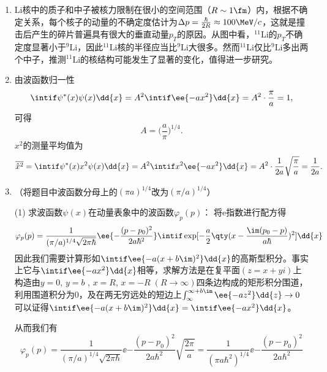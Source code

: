 \begin{enumerate}[label=2.\arabic*]
\item
Li核中的质子和中子被核力限制在很小的空间范围（$R\sim 1\fm$）内，根据不确定关系，每个核子的动量的不确定度估计为$\Delta p = \frac{\hbar}{2R} \approx 100\MeV/c$，这就是撞击后产生的碎片普遍具有很大的垂直动量$p_T$的原因。从图中看，$^{11}\mathrm{Li}$的$p_T$不确定度显著小于$^9\mathrm{Li}$，因此$^{11}\mathrm{Li}$核的半径应当比$^9\mathrm{Li}$大很多。然而$^{11}\mathrm{Li}$仅比$^9\mathrm{Li}$多出两个中子，推测$^{11}\mathrm{Li}$的核结构可能发生了显著的变化，值得进一步研究。

\item
由波函数归一性
\[\intif \psi^*(x)\psi(x)\dd{x} = A^2 \intif \ee{-ax^2}\dd{x} = A^2\cdot \frac{\pi}{a} = 1,\]
可得
\[A=\Big(\frac{a}{\pi}\Big)^{1/4}.\]
$x^2$的测量平均值为
\[\overline{\hat{x}^2} = \intif \psi^*(x)x^2\psi(x)\dd{x} = A^2\intif x^2 \ee{-ax^2}\dd{x}= A^2\cdot\frac{1}{2a}\sqrt{\frac{\pi}{a}}= \frac{1}{2a}.\]

\item
（将题目中波函数分母上的$(\pi a)^{1/4}$改为$(\pi/a)^{1/4}$）

(1) 求波函数$\psi(x)$在动量表象中的波函数$\varphi_p(p)$：
将e指数进行配方得
\[\varphi_p(p)= \frac{1}{(\pi/a)^{1/4}\sqrt{2\pi\hbar}}\ee{-\frac{(p-p_0)^2}{2a\hbar^2}}  \intif  \exp[-\frac{a}{2}\qty(x - \frac{\im(p_0-p)}{a\hbar})^2] \dd{x}
\]
因此我们需要计算形如$\intif \ee{-a(x+b\im)^2}\dd{x}$的高斯型积分。事实上它与$\intif \ee{-ax^2}\dd{x}$相等，求解方法是在复平面$(z=x+yi)$上构造由$y=0$, $y=b$ , $x=R$, $x=-R\;(R\rightarrow \infty)$四条边构成的矩形积分围道，利用围道积分为0，及在两无穷远处的短边上$\int_{\infty}^{\infty+b\im} \ee{-az^2}\dd{z}\rightarrow 0$可以证得$\intif \ee{-a(x+b\im)^2}\dd{x} = \intif \ee{-ax^2}\dd{x}$。

从而我们有
\[\varphi_p(p) = \frac{1}{(\pi/a)^{1/4}\sqrt{2\pi\hbar}}\ee{-\frac{(p-p_0)^2}{2a\hbar^2}}\sqrt{\frac{2\pi}{a}} =\frac{1}{(\pi a \hbar^2)^{1/4}}\ee{-\frac{(p-p_0)^2}{2a\hbar^2}}\]


\end{enumerate}
